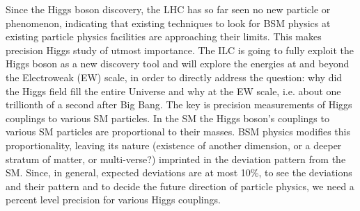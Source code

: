 Since the Higgs boson discovery, the LHC has so far seen no new particle or phenomenon, indicating that existing techniques to look for BSM physics at existing particle physics facilities are approaching their limits. This makes precision Higgs study of utmost importance. The ILC is going to fully exploit the Higgs boson as a new discovery tool and will explore the energies at and beyond the Electroweak (EW) scale, in order to directly address the question: why did the Higgs field fill the entire Universe and why at the EW scale, i.e. about one trillionth of a second after Big Bang. 
The key is precision measurements of Higgs couplings to various SM particles. In the SM the Higgs boson's couplings to various SM particles are proportional to their masses. BSM physics modifies this proportionality, leaving its nature (existence of another dimension, or a deeper stratum of matter, or multi-verse?) imprinted in the deviation pattern from the SM. 
Since, in general, expected deviations are at most 10\%, to see the deviations and their pattern and to decide the future direction of particle physics, we need a percent level precision for various Higgs couplings.

